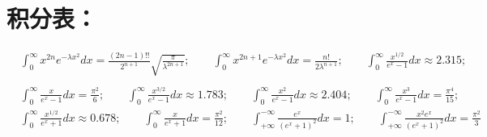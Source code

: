 \documentclass[UTF8]{ctexart}
\begin{document}
\section*{积分表：}
\begin{equation*}
  \begin{aligned}
     & \int_0^\infty x^{2n}e^{-\lambda x^2}dx=\frac{(2n-1)!!}{2^{n+1}}\sqrt{\frac{\pi}{\lambda^{2n+1}}};\quad\quad
    \int_0^\infty x^{2n+1}e^{-\lambda x^2}dx=\frac{n!}{2\lambda^{n+1}};\quad\quad
    \int_0^\infty \frac{x^{1/2}}{e^x-1}dx\approx2.315;\quad\quad                                                   \\                                                   \\
     & \int_0^\infty \frac{x}{e^x-1}dx=\frac{\pi^2}{6};\quad\quad
    \int_0^\infty \frac{x^{3/2}}{e^x-1}dx\approx1.783;\quad\quad
    \int_0^\infty \frac{x^2}{e^x-1}dx\approx2.404;\quad\quad
    \int_0^\infty \frac{x^3}{e^x-1}dx=\frac{\pi^4}{15};\quad\quad                                                  \\
     & \int_0^\infty \frac{x^{1/2}}{e^x+1}dx\approx0.678;\quad\quad
    \int_0^\infty \frac{x}{e^x+1}dx=\frac{\pi^2}{12};\quad\quad
    \int_{+\infty}^{-\infty}\frac{e^x}{(e^x+1)^2}dx=1;\quad\quad
    \int_{+\infty}^{-\infty}\frac{x^2e^x}{(e^x+1)^2}dx=\frac{\pi^2}{3}
  \end{aligned}
\end{equation*}
\end{document}
